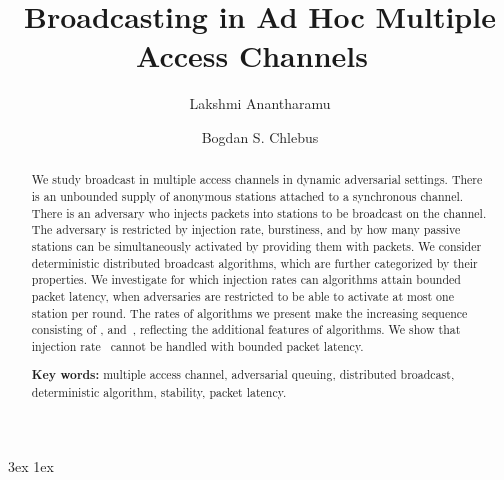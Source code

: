 \documentclass[11pt]{article}
\newcommand{\FFF}{\vspace*{\bigskipamount}}
\begin{document}
\baselineskip 	3ex
\parskip 		1ex

\title{			Broadcasting in Ad Hoc Multiple Access Channels~\footnotemark[1]\FFF\FFF}

\author{		Lakshmi Anantharamu \footnotemark[2]	
			\and 
			Bogdan S. Chlebus \footnotemark[2]}



\date{}

\maketitle



\FFF



\begin{abstract}
We study broadcast in multiple access channels in dynamic  adversarial settings.
There is an unbounded supply of anonymous stations attached to a synchronous channel.
There is an adversary who  injects packets into stations to be broadcast on the channel.
The adversary is restricted by injection rate, burstiness, and by how many passive stations can be simultaneously activated by providing them with packets.
We consider deterministic distributed broadcast algorithms, which are further categorized by their properties.
We investigate for which injection rates can algorithms attain bounded packet latency,  when adversaries are restricted to be able to activate at most one station per round.
The rates of algorithms we present make the increasing sequence consisting of ,  and~, reflecting the additional features of algorithms.
We show that injection rate~ cannot be handled with bounded packet latency.



\FFF\FFF

\noindent
\textbf{Key words:}
multiple access channel, 
adversarial queuing,
distributed broadcast,
deterministic algorithm,
stability,
packet latency.
\end{abstract}


\vfill



\thispagestyle{empty}
\setcounter{page}{0}
\end{document}
